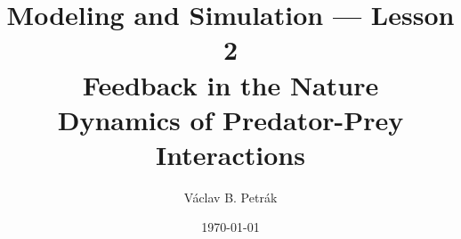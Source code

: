 \documentclass[11pt]{beamer}
\title{
Modeling and Simulation --- Lesson 2\\
\textbf{Feedback in the Nature\\
Dynamics of Predator-Prey Interactions}}
\author{Václav B. Petrák}
\institute{Faculty of Biomedical Engineering\\
Czech Technical University}
\date{\today}
\begin{document}
\begin{frame}
  \titlepage
\end{frame}

     
    
\end{document}
